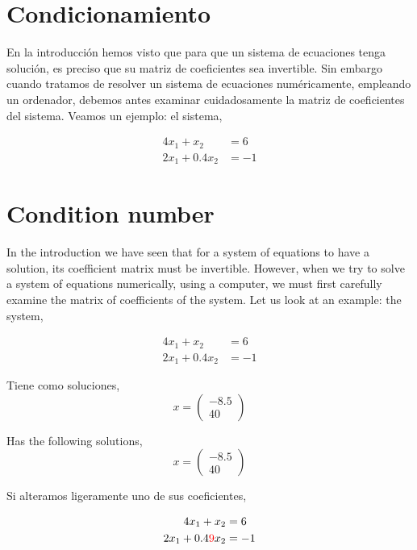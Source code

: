 \begin{paracol}{2}
\section{Condicionamiento}
En la introducción hemos visto que para que un sistema de ecuaciones tenga solución, es preciso que su matriz de coeficientes sea invertible. Sin embargo cuando tratamos de resolver un sistema de ecuaciones numéricamente, empleando un ordenador, debemos antes examinar cuidadosamente la matriz de coeficientes del sistema. Veamos un ejemplo: el sistema,

\begin{align*}
4x_1+x_2&=6\\
2x_1+0.4 x_2&=-1
\end{align*}
\switchcolumn
\section{Condition number}
In the introduction we have seen that for a system of equations to have a solution, its coefficient matrix must be invertible. However, when we try to solve a system of equations numerically, using a computer, we must first carefully examine the matrix of coefficients of the system. Let us look at an example: the system,

\begin{align*}
4x_1+x_2&=6\\
2x_1+0.4 x_2&=-1
\end{align*}

\switchcolumn

Tiene como soluciones,
\begin{equation*}
x=\begin{pmatrix}
-8.5\\
40
\end{pmatrix}
\end{equation*}

\switchcolumn
 Has the following solutions,
 \begin{equation*}
x=\begin{pmatrix}
-8.5\\
40
\end{pmatrix}
\end{equation*}

\switchcolumn

Si alteramos ligeramente uno de sus coeficientes,

\begin{align*}
4x_1+x_2&=6\\
2x_1+0.4{\color{red}9} x_2&=-1
\end{align*}


\end{paracol}
